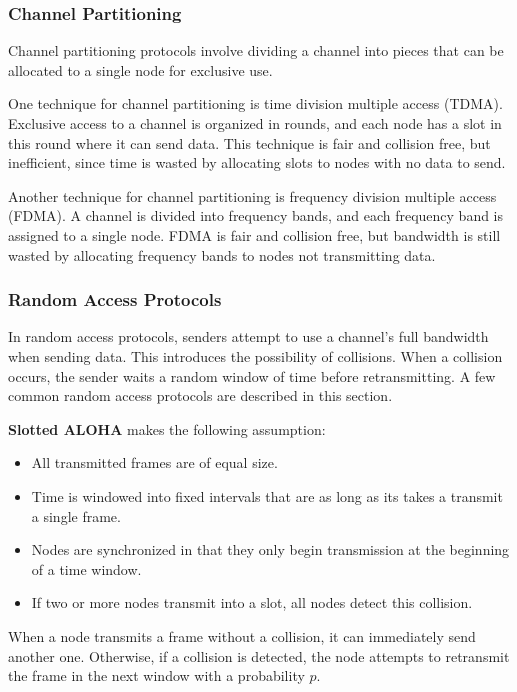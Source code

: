 \documentclass[12pt,titlepage]{article}
\begin{document}
      \subsubsection{Channel Partitioning}
        Channel partitioning protocols involve dividing a channel into pieces that can be allocated to a single node for exclusive use.

        One technique for channel partitioning is time division multiple access (TDMA). Exclusive access to a channel is organized in rounds, and each
        node has a slot in this round where it can send data. This technique is fair and collision free, but inefficient, since time is wasted by allocating
        slots to nodes with no data to send.

        Another technique for channel partitioning is frequency division multiple access (FDMA). A channel is divided into frequency bands, and each frequency
        band is assigned to a single node. FDMA is fair and collision free, but bandwidth is still wasted by allocating frequency bands to nodes not transmitting
        data.

      \subsubsection{Random Access Protocols}
        In random access protocols, senders attempt to use a channel's full bandwidth when sending data. This introduces the possibility of collisions. When
        a collision occurs, the sender waits a random window of time before retransmitting. A few common random access protocols are described in this section.

        \textbf{Slotted ALOHA} makes the following assumption:
        \begin{itemize}
          \item All transmitted frames are of equal size.
          \item Time is windowed into fixed intervals that are as long as its takes a transmit a single frame.
          \item Nodes are synchronized in that they only begin transmission at the beginning of a time window.
          \item If two or more nodes transmit into a slot, all nodes detect this collision.
        \end{itemize}

        When a node transmits a frame without a collision, it can immediately send another one. Otherwise, if a collision is detected, the node attempts to
        retransmit the frame in the next window with a probability $p$.
\end{document}
